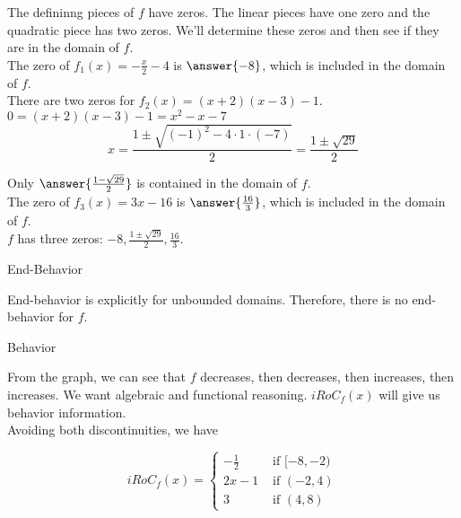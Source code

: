 \documentclass{ximera}
\begin{document}
\begin{exercise}
\begin{question}
The defininng pieces of $f$ have zeros.  The linear pieces have one zero and the quadratic piece has two zeros.  We'll determine these zeros and then see if they are in the domain of $f$. \\



The zero of $f_1(x) = -\frac{x}{2} - 4$ is $\answer{-8}$, which is included in the domain of $f$. \\

There are two zeros for $f_2(x) = (x+2)(x-3) - 1$. \\


$ 0 = (x+2)(x-3) - 1 = x^2 - x - 7$ \\

\[
x = \frac{1 \pm \sqrt{(-1)^2 - 4 \cdot 1 \cdot (-7)}}{2} = \frac{1 \pm \sqrt{29}}{2}
\]


Only $\answer{\frac{1 - \sqrt{29}}{2}}$ is contained in the domain of $f$. \\


The zero of $f_3(x) = 3x-16$ is $\answer{\frac{16}{3}}$, which is included in the domain of $f$. \\




$f$ has three zeros:  $-8, \frac{1 \pm \sqrt{29}}{2}, \frac{16}{3}$.


\end{question}





\begin{question} End-Behavior



End-behavior is explicitly for unbounded domains.  Therefore, there is no end-behavior for $f$.


\end{question}






\begin{question} Behavior



From the graph, we can see that $f$ decreases, then decreases, then increases, then increases.  We want algebraic and functional reasoning. $iRoC_f(x)$ will give us behavior information.   \\


Avoiding both discontinuities, we have

\[
iRoC_f(x) = 
\begin{cases}
  -\frac{1}{2}   & \text{ if } [-8, -2)   \\
  2x - 1      & \text{ if } (-2, 4)  \\
  3             & \text{ if } (4,8)
\end{cases}
\]



\end{question}
\end{exercise}
\end{document}
